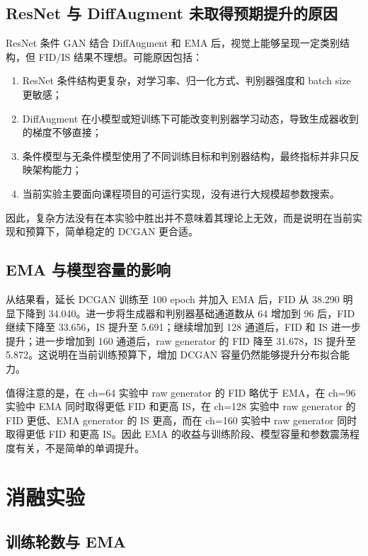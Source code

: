 \documentclass[UTF8,a4paper,12pt]{ctexart}
\begin{document}
\subsection{ResNet 与 DiffAugment 未取得预期提升的原因}

ResNet 条件 GAN 结合 DiffAugment 和 EMA 后，视觉上能够呈现一定类别结构，但 FID/IS 结果不理想。可能原因包括：


\begin{enumerate}
\item ResNet 条件结构更复杂，对学习率、归一化方式、判别器强度和 batch size 更敏感；
\item DiffAugment 在小模型或短训练下可能改变判别器学习动态，导致生成器收到的梯度不够直接；
\item 条件模型与无条件模型使用了不同训练目标和判别器结构，最终指标并非只反映架构能力；
\item 当前实验主要面向课程项目的可运行实现，没有进行大规模超参数搜索。
\end{enumerate}


因此，复杂方法没有在本实验中胜出并不意味着其理论上无效，而是说明在当前实现和预算下，简单稳定的 DCGAN 更合适。


\subsection{EMA 与模型容量的影响}

从结果看，延长 DCGAN 训练至 100 epoch 并加入 EMA 后，FID 从 38.290 明显下降到 34.040。进一步将生成器和判别器基础通道数从 64 增加到 96 后，FID 继续下降至 33.656，IS 提升至 5.691；继续增加到 128 通道后，FID 和 IS 进一步提升；进一步增加到 160 通道后，raw generator 的 FID 降至 31.678，IS 提升至 5.872。这说明在当前训练预算下，增加 DCGAN 容量仍然能够提升分布拟合能力。


值得注意的是，在 ch=64 实验中 raw generator 的 FID 略优于 EMA，在 ch=96 实验中 EMA 同时取得更低 FID 和更高 IS，在 ch=128 实验中 raw generator 的 FID 更低、EMA generator 的 IS 更高，而在 ch=160 实验中 raw generator 同时取得更低 FID 和更高 IS。因此 EMA 的收益与训练阶段、模型容量和参数震荡程度有关，不是简单的单调提升。


\section{消融实验}

\subsection{训练轮数与 EMA}
\end{document}
